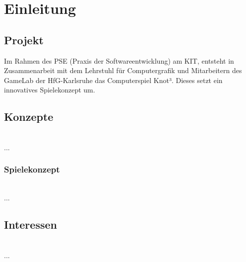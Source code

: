 \chapter{Einleitung}


\section{Projekt}

Im Rahmen des PSE (Praxis der Softwareentwicklung) am KIT, entsteht in Zusammenarbeit mit dem Lehrstuhl für Computergrafik und Mitarbeitern des GameLab der HfG-Karlsruhe das Computerspiel Knot³.
Dieses setzt ein innovatives Spielekonzept um.


\section{Konzepte}

~\\
...

\subsection{Spielekonzept}

~\\
...


\section{Interessen}

~\\
...

